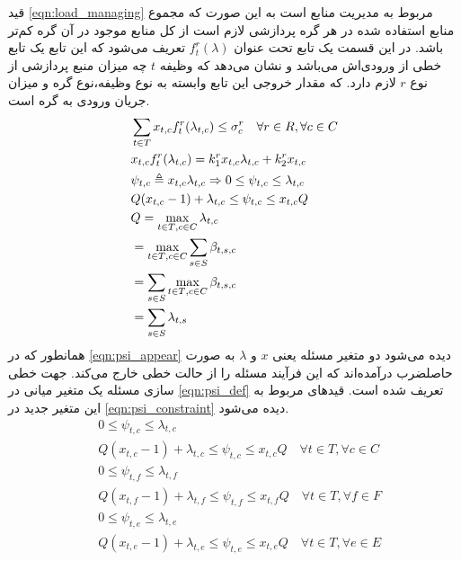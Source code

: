 	قید \cref{eqn:load_managing} مربوط به مدیریت منابع است به این‌ صورت که مجموع منابع استفاده شده در هر گره پردازشی لازم است از کل منابع موجود در آن گره کم‌تر باشد. در این قسمت یک تابع تحت عنوان $f_t^r(\lambda)$ تعریف می‌شود که این تابع یک تابع خطی از ورودی‌اش می‌باشد و نشان می‌دهد که وظیفه $t$ چه میزان منبع پردازشی از نوع $r$ لازم دارد. که مقدار خروجی این تابع وابسته به نوع وظیفه،نوع گره و میزان جریان ورودی به گره است. 
	\begin{subequations}\label{eqn:load_managing}
		\begin{align}
		&\sum_{t \in T}x_{t,c}f_t^r(\lambda_{t,c}) \le \sigma_c^r \quad \forall{r \in R}, \forall{c \in C} \\
		&x_{t,c}f_t^r(\lambda_{t,c}) = k_1^rx_{t,c}\lambda_{t,c} + k_2^rx_{t,c} \label{eqn:psi_appear} \\
		&\psi_{t,c} \triangleq x_{t,c}\lambda_{t,c} \Rightarrow 0 \leq \psi_{t,c} \leq \lambda_{t,c} \label{eqn:psi_def} \\
		&Q(x_{t,c}-1)+\lambda_{t,c} \leq \psi_{t,c} \leq x_{t,c}Q \\
		&\notag Q = \max_{{t \in T},{c \in C}} \lambda_{t,c} \\
		&\notag =\max_{{t \in T},{c \in C}} \sum_{s \in S}\beta_{t,s,c} \\
		&\notag =\sum_{s\in S} \max_{{t \in T},{c \in C}} \beta_{t,s,c} \\
		&=\sum_{s \in S}\lambda_{t,s}
		\end{align}
	\end{subequations}
	همانطور که در \cref{eqn:psi_appear} دیده می‌شود دو متغیر مسئله یعنی $x$ و $\lambda$ به صورت حاصلضرب درآمده‌اند که این فرآیند مسئله را از حالت خطی خارج می‌کند. جهت خطی سازی مسئله یک متغیر میانی در \cref{eqn:psi_def} تعریف شده است.
	قیدهای مربوط به این متغیر جدید در \cref{eqn:psi_constraint} دیده می‌شود. 
	\begin{subequations}\label{eqn:psi_constraint}
		\begin{align}
		&0 \leq \psi_{t,c} \leq \lambda_{t,c} \\
		&Q(x_{t,c}-1)+\lambda_{t,c} \leq \psi_{t,c} \leq x_{t,c}Q \quad \forall{t\in T}, \forall{c \in C} \\
		&0 \leq \psi_{t,f} \leq \lambda_{t,f} \\
		&Q(x_{t,f}-1)+\lambda_{t,f} \leq \psi_{t,f} \leq x_{t,f}Q \quad \forall{t \in T}, \forall{f \in F} \\
		&0 \leq \psi_{t,e} \leq \lambda_{t,e} \\
		&Q(x_{t,e}-1)+\lambda_{t,e} \leq \psi_{t,e} \leq x_{t,e}Q \quad \forall{t \in T}, \forall{e \in E}
		\end{align}
	\end{subequations}

